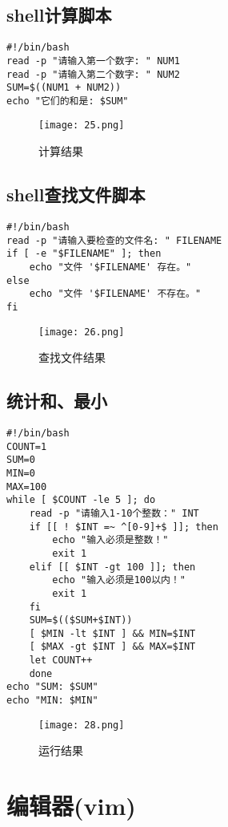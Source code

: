 \documentclass[a4paper, 12pt]{article}
\begin{document}
\subsection{shell计算脚本}  
\begin{lstlisting}
#!/bin/bash
read -p "请输入第一个数字: " NUM1
read -p "请输入第二个数字: " NUM2
SUM=$((NUM1 + NUM2))
echo "它们的和是: $SUM"
\end{lstlisting}
\begin{figure}[H]
  \centering
    \texttt{[image: 25.png]}
  \caption{计算结果}
   \end{figure}

  \subsection{shell查找文件脚本}  
\begin{lstlisting}
#!/bin/bash
read -p "请输入要检查的文件名: " FILENAME
if [ -e "$FILENAME" ]; then
    echo "文件 '$FILENAME' 存在。"
else
    echo "文件 '$FILENAME' 不存在。"
fi
\end{lstlisting}

\begin{figure}[H]
  \centering
    \texttt{[image: 26.png]}
  \caption{查找文件结果}
   \end{figure}

\subsection{统计和、最小}  
\begin{lstlisting}
#!/bin/bash  
COUNT=1  
SUM=0  
MIN=0  
MAX=100  
while [ $COUNT -le 5 ]; do  
    read -p "请输入1-10个整数：" INT      
    if [[ ! $INT =~ ^[0-9]+$ ]]; then  
        echo "输入必须是整数！"  
        exit 1  
    elif [[ $INT -gt 100 ]]; then  
        echo "输入必须是100以内！"  
        exit 1  
    fi  
    SUM=$(($SUM+$INT))  
    [ $MIN -lt $INT ] && MIN=$INT  
    [ $MAX -gt $INT ] && MAX=$INT  
    let COUNT++  
    done  
echo "SUM: $SUM"  
echo "MIN: $MIN"   
\end{lstlisting}
\begin{figure}[H]
  \centering
    \texttt{[image: 28.png]}
  \caption{运行结果}
   \end{figure}
   
\section{编辑器(vim)}
\end{document}
